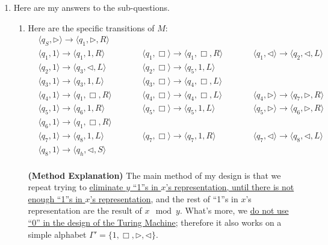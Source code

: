 \documentclass[12pt,a4paper]{article}
\makeatletter
\newtheorem*{solution}{Solution}
\theoremstyle{definition}
\renewenvironment{solution}[1][Solution] {\par\pushQED{\qed}\normalfont\topsep6\p@\@plus6\p@\relax\trivlist\item[\hskip\labelsep\bfseries#1\@addpunct{.}]\ignorespaces}{\popQED\endtrivlist\@endpefalse} \makeatother
\makeatother
\begin{document}
\begin{enumerate}
\begin{enumerate}
\end{enumerate}
\begin{solution}
Here are my answers to the sub-questions.
\begin{enumerate}
\item Here are the specific transitions of $M$:
\begin{displaymath}
\begin{aligned}
& \langle q_S, \triangleright \rangle \rightarrow \langle q_1, \triangleright, R\rangle & \\
& \langle q_1, 1 \rangle \rightarrow \langle q_1, 1, R\rangle & \qquad
& \langle q_1, \Box \rangle \rightarrow \langle q_1, \Box, R\rangle & \qquad
& \langle q_1, \triangleleft \rangle \rightarrow \langle q_2, \triangleleft, L\rangle & \\
& \langle q_2, 1 \rangle \rightarrow \langle q_3, \triangleleft, L\rangle &
& \langle q_2, \Box \rangle \rightarrow \langle q_5, 1, L\rangle & \\
& \langle q_3, 1 \rangle \rightarrow \langle q_3, 1, L\rangle & \qquad
& \langle q_3, \Box \rangle \rightarrow \langle q_4, \Box, L\rangle & \\
& \langle q_4, 1 \rangle \rightarrow \langle q_1, \Box, R\rangle & \qquad
& \langle q_4, \Box \rangle \rightarrow \langle q_4, \Box, L\rangle & \qquad
& \langle q_4, \triangleright \rangle \rightarrow \langle q_7, \triangleright, R\rangle & \\
& \langle q_5, 1 \rangle \rightarrow \langle q_6, 1, R\rangle & \qquad
& \langle q_5, \Box \rangle \rightarrow \langle q_5, 1, L\rangle & \qquad
& \langle q_5, \triangleright \rangle \rightarrow \langle q_6, \triangleright, R\rangle & \\
& \langle q_6, 1 \rangle \rightarrow \langle q_1, \Box, R\rangle & \\
& \langle q_7, 1 \rangle \rightarrow \langle q_8, 1, L\rangle & \qquad
& \langle q_7, \Box \rangle \rightarrow \langle q_7, 1, R\rangle & \qquad
& \langle q_7, \triangleleft \rangle \rightarrow \langle q_8, \triangleleft, L\rangle & \\
& \langle q_8, 1 \rangle \rightarrow \langle q_h, \triangleleft, S\rangle & \\
\end{aligned}
\end{displaymath}

\textbf{(Method Explanation)} The main method of my design is that we repeat trying to \underline{eliminate $y$ ``1''s in $x$'s representation, until there is not enough ``1''s in $x$'s representation}, and the rest of ``1''s in $x$'s representation are the result of $x\mod y$. What's more, we \underline{do not use ``0'' in the design of the Turing Machine}; therefore it also works on a simple alphabet $\Gamma'=\{1, \Box, \triangleright, \triangleleft\}$.


\end{enumerate}
\end{solution}
\end{enumerate}
\end{document}
